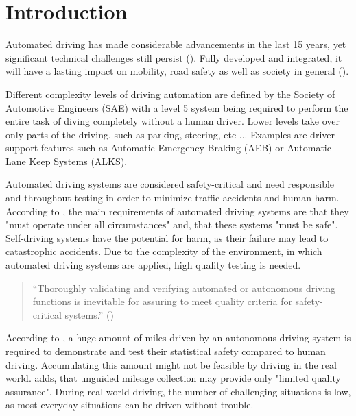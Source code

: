 \chapter{Introduction}
Automated driving has made considerable advancements in the last 15 years, yet significant technical challenges still persist (\cite{ayoub_manual_2019}).
Fully developed and integrated, it will have a lasting impact on mobility, road safety as well as society in general (\cite{milakis_policy_2017}).

Different complexity levels of driving automation are defined by the Society of Automotive Engineers (SAE)\cite{saej3016} with a level 5 system being required to perform the entire task of diving completely without a human driver. Lower levels take over only parts of the driving, such as parking, steering, etc ... Examples are driver support features such as Automatic Emergency Braking (AEB) or Automatic Lane Keep Systems (ALKS).

Automated driving systems are considered safety-critical and need responsible and throughout testing in order to minimize traffic accidents and human harm. According to \cite{kluck_search-based_2022}, the main requirements of automated driving systems are that they "must operate under all circumstances" and, that these systems "must be safe". Self-driving systems have the potential for harm, as their failure may lead to catastrophic accidents. Due to the complexity of the environment, in which automated driving systems are applied, high quality testing is needed. 

\begin{quote}
	\begin{em}
		\enquote{Thoroughly validating and verifying automated or autonomous driving functions is inevitable for assuring to meet quality criteria for safety-critical systems.} (\cite{felbinger_comparing_2019})
	\end{em}
\end{quote}

According to \cite{kalra_driving_2016}, a huge amount of miles driven by an autonomous driving system is required to demonstrate and test their statistical safety compared to human driving. Accumulating this amount might not be feasible by driving in the real world.
\cite{kluck_search-based_2022} adds, that unguided mileage collection may provide only "limited quality assurance". During real world driving, the number of challenging situations is low, as most everyday situations can be driven without trouble.

